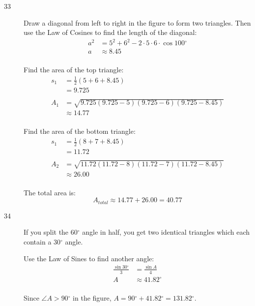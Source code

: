 \documentclass{exam}
\newcommand{\dg}{\ensuremath{^\circ}}
\begin{document}
\begin{description}
      \pagebreak

      \item[33]
        Draw a diagonal from left to right in the figure to form two triangles.  Then use the Law of Cosines to find the
        length of the diagonal:
        \begin{align*}
          a^2 & = 5^2 + 6^2 - 2 \cdot 5 \cdot 6 \cdot \cos 100 \dg \\
          a   & \approx 8.45 \\
        \end{align*}

        Find the area of the top triangle:
        \begin{align*}
          s_1 & = \frac{1}{2}(5 + 6 + 8.45) \\
              & = 9.725 \\
          \\
          A_1 & = \sqrt{9.725 (9.725 - 5)(9.725 - 6) (9.725 - 8.45)} \\
              & \approx 14.77 \\
        \end{align*}

        Find the area of the bottom triangle:
        \begin{align*}
          s_1 & = \frac{1}{2}(8 + 7 + 8.45) \\
              & = 11.72 \\
          \\
          A_2 & = \sqrt{11.72 (11.72 - 8)(11.72 - 7) (11.72 - 8.45)} \\
              & \approx 26.00 \\
        \end{align*}

        The total area is: 
        \[
          A_{total} \approx 14.77 + 26.00 = \boxed{ 40.77 }
        \]

      \item[34]
        If you split the $60 \dg$ angle in half, you get two identical triangles which each contain a $30 \dg$ angle.

        Use the Law of Sines to find another angle:
        \begin{align*}
          \frac{\sin 30 \dg}{3} & = \frac{\sin A}{4} \\
          A                     & \approx 41.82 \dg \\
        \end{align*}

        Since $\angle A > 90 \dg$ in the figure, $A = 90 \dg + 41.82 \dg = 131.82 \dg$.


\end{description}
\end{document}
